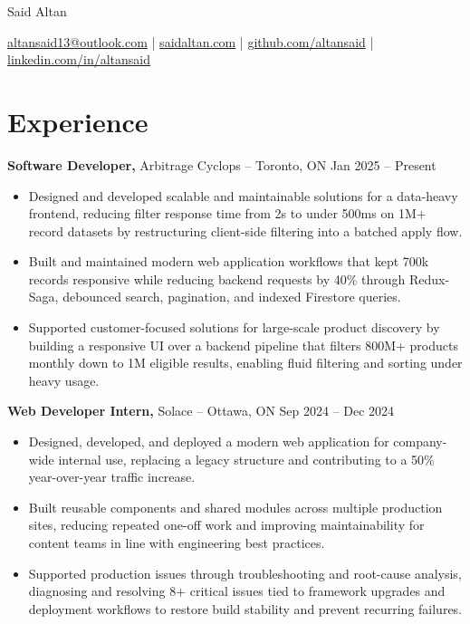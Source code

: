 \documentclass[11pt]{article}       %
\begin{document}
\centerline{\Huge Said Altan}

\vspace{10pt}

\centerline{\href{mailto:altansaid13@outlook.com}{altansaid13@outlook.com} | \href{https://saidaltan.com}{saidaltan.com} | \href{https://github.com/altansaid}{github.com/altansaid} | \href{https://www.linkedin.com/in/altansaid}{linkedin.com/in/altansaid}}


\vspace{5pt}
\section*{Experience}
\textbf{Software Developer,} {Arbitrage Cyclops} -- Toronto, ON \hfill Jan 2025 -- Present \\
\vspace{-9pt}
\begin{itemize}
  \item Designed and developed scalable and maintainable solutions for a data-heavy frontend, reducing filter response time from 2s to under 500ms on 1M+ record datasets by restructuring client-side filtering into a batched apply flow.
  \item Built and maintained modern web application workflows that kept 700k records responsive while reducing backend requests by 40\% through Redux-Saga, debounced search, pagination, and indexed Firestore queries.
  \item Supported customer-focused solutions for large-scale product discovery by building a responsive UI over a backend pipeline that filters 800M+ products monthly down to 1M eligible results, enabling fluid filtering and sorting under heavy usage.
\end{itemize}

\textbf{Web Developer Intern,} {Solace} -- Ottawa, ON \hfill Sep 2024 -- Dec 2024 \\
\vspace{-9pt}
\begin{itemize}
  \item Designed, developed, and deployed a modern web application for company-wide internal use, replacing a legacy structure and contributing to a 50\% year-over-year traffic increase.
  \item Built reusable components and shared modules across multiple production sites, reducing repeated one-off work and improving maintainability for content teams in line with engineering best practices.
  \item Supported production issues through troubleshooting and root-cause analysis, diagnosing and resolving 8+ critical issues tied to framework upgrades and deployment workflows to restore build stability and prevent recurring failures.
\end{itemize}
\end{document}
